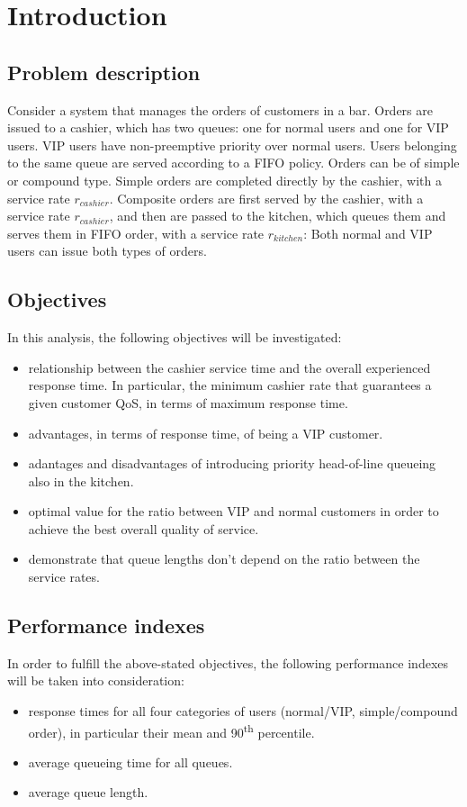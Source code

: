 \section{Introduction}

\subsection{Problem description}
Consider a system that manages the orders of customers in a bar. Orders are issued to a cashier, which
has two queues: one for normal users and one for VIP users. VIP users have non-preemptive priority
over normal users. Users belonging to the same queue are served according to a FIFO policy.
Orders can be of simple or compound type. Simple orders are completed directly by the cashier, with
a service rate $r_{cashier}$. Composite orders are first served by the cashier, with a service rate $r_{cashier}$, and
then are passed to the kitchen, which queues them and serves them in FIFO order, with a service rate
$r_{kitchen}$: Both normal and VIP users can issue both types of orders.

\subsection{Objectives}
In this analysis, the following objectives will be investigated:
\begin{itemize}
    \item relationship between the cashier service time and the overall experienced
        response time. In particular, the minimum cashier rate that guarantees a 
        given customer QoS, in terms of maximum response time.
    \item advantages, in terms of response time, of being a VIP customer.
    \item adantages and disadvantages of introducing priority head-of-line queueing
        also in the kitchen.
    \item optimal value for the ratio between VIP and normal customers in order to achieve the best overall quality of service.
    \item demonstrate that queue lengths don't depend on the ratio between the service rates.
\end{itemize}

\subsection{Performance indexes}
In order to fulfill the above-stated objectives, the following performance 
indexes will be taken into consideration:
\begin{itemize}
    \item response times for all four categories of users (normal/VIP, 
    simple/compound order), in particular their mean and 90\textsuperscript{th} 
    percentile.
    \item average queueing time for all queues.
    \item average queue length.
\end{itemize}

